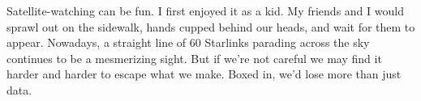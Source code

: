 Satellite-watching can be fun. I first enjoyed it as a kid. My friends and I would sprawl out on the sidewalk, hands cupped behind our heads, and wait for them to appear. Nowadays, a straight line of 60 Starlinks parading across the sky continues to be a mesmerizing sight. But if we're not careful we may find it harder and harder to escape what we make. Boxed in, we'd lose more than just data.
